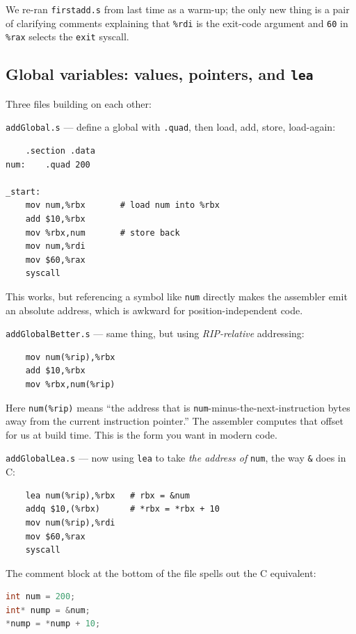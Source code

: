 \documentclass[11pt]{article}
\begin{document}
We re-ran \texttt{firstadd.s} from last time as a warm-up; the only
new thing is a pair of clarifying comments explaining that
\texttt{\%rdi} is the exit-code argument and \texttt{60} in
\texttt{\%rax} selects the \texttt{exit} syscall.

\subsection*{Global variables: values, pointers, and \texttt{lea}}

Three files building on each other:

\texttt{addGlobal.s} --- define a global with \texttt{.quad}, then
load, add, store, load-again:

\begin{lstlisting}
    .section .data
num:    .quad 200

_start:
    mov num,%rbx       # load num into %rbx
    add $10,%rbx
    mov %rbx,num       # store back
    mov num,%rdi
    mov $60,%rax
    syscall
\end{lstlisting}

This works, but referencing a symbol like \texttt{num} directly makes
the assembler emit an absolute address, which is awkward for
position-independent code.

\texttt{addGlobalBetter.s} --- same thing, but using
\emph{RIP-relative} addressing:

\begin{lstlisting}
    mov num(%rip),%rbx
    add $10,%rbx
    mov %rbx,num(%rip)
\end{lstlisting}

Here \texttt{num(\%rip)} means ``the address that is
\texttt{num}-minus-the-next-instruction bytes away from the current
instruction pointer.'' The assembler computes that offset for us at
build time. This is the form you want in modern code.

\texttt{addGlobalLea.s} --- now using \texttt{lea} to take
\emph{the address of} \texttt{num}, the way \texttt{\&} does in C:

\begin{lstlisting}
    lea num(%rip),%rbx   # rbx = &num
    addq $10,(%rbx)      # *rbx = *rbx + 10
    mov num(%rip),%rdi
    mov $60,%rax
    syscall
\end{lstlisting}

The comment block at the bottom of the file spells out the C
equivalent:
\begin{lstlisting}[language=C]
int num = 200;
int* nump = &num;
*nump = *nump + 10;
\end{lstlisting}
\end{document}
